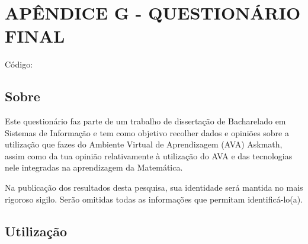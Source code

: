 \chapter*{APÊNDICE G - QUESTIONÁRIO FINAL}\label{apendice_questionario_final}


\noindent
Código: 

\section{Sobre}

Este questionário faz parte de um trabalho de dissertação de Bacharelado em Sistemas de Informação e tem como objetivo 
recolher dados e opiniões sobre a utilização que fazes do Ambiente Virtual de Aprendizagem (AVA) Askmath, assim como da tua opinião relativamente à utilização do AVA e das 
tecnologias nele integradas na aprendizagem da Matemática.

Na publicação dos resultados desta pesquisa, sua identidade será mantida no mais rigoroso sigilo. Serão omitidas todas as informações que permitam identificá-lo(a). 

\section{Utilização}

